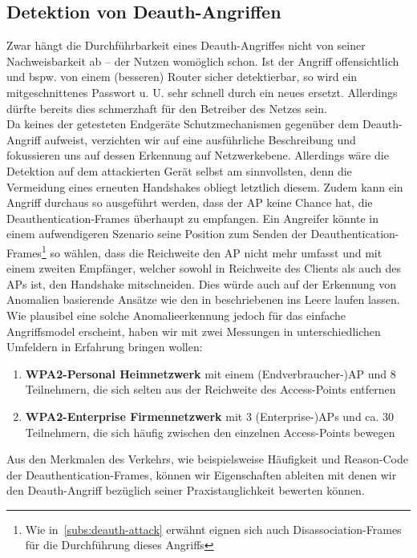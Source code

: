 \subsection{Detektion von Deauth-Angriffen}
Zwar hängt die Durchführbarkeit eines Deauth-Angriffes nicht von seiner Nachweisbarkeit ab -- der Nutzen womöglich schon. Ist der Angriff offensichtlich und bspw. von einem (besseren) Router sicher detektierbar, so wird ein mitgeschnittenes Passwort u. U. sehr schnell durch ein neues ersetzt. Allerdings dürfte bereits dies schmerzhaft für den Betreiber des Netzes sein.\\
Da keines der getesteten Endgeräte Schutzmechanismen gegenüber dem Deauth-Angriff aufweist, verzichten wir auf eine ausführliche Beschreibung und fokussieren uns auf dessen Erkennung auf Netzwerkebene. Allerdings wäre die Detektion auf dem attackierten Gerät selbst am sinnvollsten, denn die Vermeidung eines erneuten Handshakes obliegt letztlich diesem. Zudem kann ein Angriff durchaus so ausgeführt werden, dass der AP keine Chance hat, die Deauthentication-Frames überhaupt zu empfangen.
Ein Angreifer könnte in einem aufwendigeren Szenario seine Position zum Senden der Deauthentication-Frames\footnote{Wie in~\ref{subs:deauth-attack} erwähnt eignen sich auch Disassociation-Frames für die Durchführung dieses Angriffs} so wählen, dass die Reichweite den AP nicht mehr umfasst und mit einem zweiten Empfänger, welcher sowohl in Reichweite des Clients als auch des APs ist, den Handshake mitschneiden.
Dies würde auch auf der Erkennung von Anomalien basierende Ansätze wie den in \cite{cheema2011deauth} beschriebenen ins Leere laufen lassen. Wie plausibel eine solche Anomalieerkennung jedoch für das einfache Angriffsmodel erscheint, haben wir mit zwei Messungen in unterschiedlichen Umfeldern in Erfahrung bringen wollen:
\begin{enumerate}
	\item \textbf{WPA2-Personal Heimnetzwerk} mit einem (Endverbraucher-)AP und 8 Teilnehmern, die sich selten aus der Reichweite des Access-Points entfernen
	\item \textbf{WPA2-Enterprise Firmennetzwerk} mit 3 (Enterprise-)APs und ca. 30 Teilnehmern, die sich häufig zwischen den einzelnen Access-Points bewegen
\end{enumerate}
Aus den Merkmalen des Verkehrs, wie beispielsweise Häufigkeit und Reason-Code der Deauthentication-Frames, können wir Eigenschaften ableiten mit denen wir den Deauth-Angriff bezüglich seiner Praxistauglichkeit bewerten können.\\

